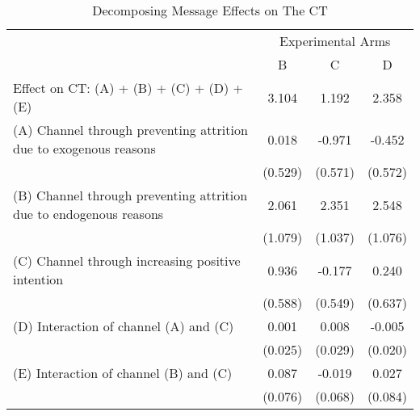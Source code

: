 \documentclass[12pt, a4paper]{article}
\begin{document}
\begin{table}[H]

\caption{\label{tab:decompose-ct}Decomposing Message Effects on The CT}
\centering
\fontsize{8}{10}\selectfont
\begin{threeparttable}
\begin{tabular}[t]{lccc}
\toprule
\multicolumn{1}{c}{ } & \multicolumn{3}{c}{Experimental Arms} \\
\cmidrule(l{3pt}r{3pt}){2-4}
 & B & C & D\\
\midrule
Effect on CT: (A) + (B) + (C) + (D) + (E) & 3.104 & 1.192 & 2.358\\
(A) Channel through preventing attrition due to exogenous reasons & 0.018 & -0.971 & -0.452\\
 & (0.529) & (0.571) & (0.572)\\
(B) Channel through preventing attrition due to endogenous reasons & 2.061 & 2.351 & 2.548\\
 & (1.079) & (1.037) & (1.076)\\
(C) Channel through increasing positive intention & 0.936 & -0.177 & 0.240\\
 & (0.588) & (0.549) & (0.637)\\
(D) Interaction of channel (A) and (C) & 0.001 & 0.008 & -0.005\\
 & (0.025) & (0.029) & (0.020)\\
(E) Interaction of channel (B) and (C) & 0.087 & -0.019 & 0.027\\
 & (0.076) & (0.068) & (0.084)\\
\bottomrule
\end{tabular}
\begin{tablenotes}
\item 
\end{tablenotes}
\end{threeparttable}
\end{table}
\end{document}
